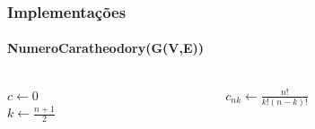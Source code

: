 \begin{frame}
\frametitle{Implementações}
\framesubtitle{NumeroCaratheodory(G(V,E))}
  \begin{columns}[T]
    \begin{column}{.5\textwidth}
    \begin{algorithm}[H]
        \label{alg:numero-caratheodory-p3}
        \SetAlFnt{\tiny}
        \SetAlCapFnt{\small}
        \SetAlCapNameFnt{\small}
        \SetAlgoLined
        \DontPrintSemicolon
        \LinesNumbered
        \SetAlgoLined
        \BlankLine
        \BlankLine
        $c \gets 0$\\
        $k \gets \frac{n + 1}{2}$\\
    \caption{$NumeroCaratheodory(G(V,E))$}
    \end{algorithm}
    \end{column}
    \begin{column}{.5\textwidth}
        \begin{algorithm}[H]
            \label{alg:busca-conjunto-caratheodory-p3}
            \SetAlFnt{\tiny}
            \SetAlCapFnt{\small}
            \SetAlCapNameFnt{\small}
            \SetAlgoLined
            \DontPrintSemicolon
            \LinesNumbered
            \SetAlgoLined
            \BlankLine
            \BlankLine
            $c_{nk} \gets \frac{n!}{k!(n-k)!}$\\
            \caption{$ConjuntoCaratheodoryK(G(V,E),k)$}
        \end{algorithm}
    \end{column}
  \end{columns}
\end{frame}

